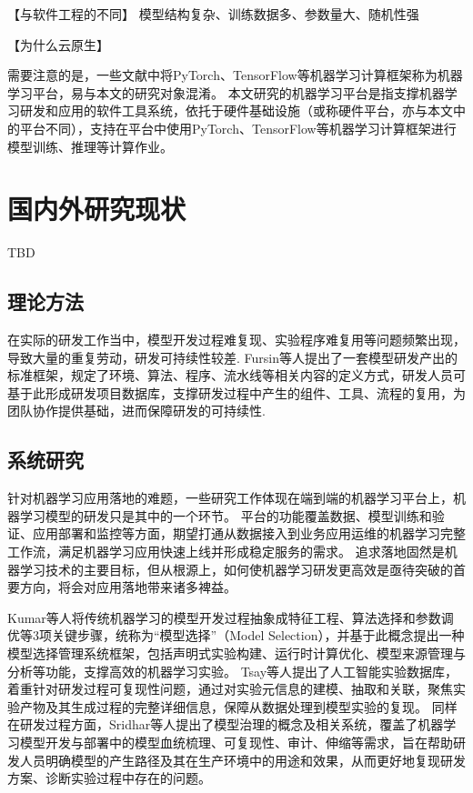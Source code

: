【与软件工程的不同】
模型结构复杂、训练数据多、参数量大、随机性强

【为什么云原生】

需要注意的是，一些文献中将PyTorch、TensorFlow等机器学习计算框架称为机器学习平台，易与本文的研究对象混淆。
本文研究的机器学习平台是指支撑机器学习研发和应用的软件工具系统，依托于硬件基础设施（或称硬件平台，亦与本文中的平台不同），支持在平台中使用PyTorch、TensorFlow等机器学习计算框架进行模型训练、推理等计算作业。


%
\section{国内外研究现状}

TBD

\subsection{理论方法}

在实际的研发工作当中，模型开发过程难复现、实验程序难复用等问题频繁出现，导致大量的重复劳动，研发可持续性较差. Fursin等人\cite{Fur16}提出了一套模型研发产出的标准框架，规定了环境、算法、程序、流水线等相关内容的定义方式，研发人员可基于此形成研发项目数据库，支撑研发过程中产生的组件、工具、流程的复用，为团队协作提供基础，进而保障研发的可持续性. 

\subsection{系统研究}

针对机器学习应用落地的难题，一些研究工作体现在端到端的机器学习平台上\cite{Bay17, Sal18}，机器学习模型的研发只是其中的一个环节。
平台的功能覆盖数据、模型训练和验证、应用部署和监控等方面，期望打通从数据接入到业务应用运维的机器学习完整工作流\cite{Ame19}，满足机器学习应用快速上线并形成稳定服务的需求。
追求落地固然是机器学习技术的主要目标，但从根源上，如何使机器学习研发更高效是亟待突破的首要方向，将会对应用落地带来诸多裨益。

Kumar等人\cite{Kum16}将传统机器学习的模型开发过程抽象成特征工程、算法选择和参数调优等3项关键步骤，统称为“模型选择”（Model Selection），并基于此概念提出一种模型选择管理系统框架，包括声明式实验构建、运行时计算优化、模型来源管理与分析等功能，支撑高效的机器学习实验。
Tsay等人\cite{Tsa22}提出了人工智能实验数据库，着重针对研发过程可复现性问题，通过对实验元信息的建模、抽取和关联，聚焦实验产物及其生成过程的完整详细信息，保障从数据处理到模型实验的复现。
同样在研发过程方面，Sridhar等人\cite{Sri18}提出了模型治理的概念及相关系统，覆盖了机器学习模型开发与部署中的模型血统梳理、可复现性、审计、伸缩等需求，旨在帮助研发人员明确模型的产生路径及其在生产环境中的用途和效果，从而更好地复现研发方案、诊断实验过程中存在的问题。


